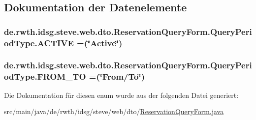 \subsection{Dokumentation der Datenelemente}
\hypertarget{enumde_1_1rwth_1_1idsg_1_1steve_1_1web_1_1dto_1_1_reservation_query_form_1_1_query_period_type_a775d5731727cbdda2f9cba8b51a4ca5a}{
\subsubsection[{A\-C\-T\-I\-V\-E}]{\setlength{\rightskip}{0pt plus 5cm}de.\-rwth.\-idsg.\-steve.\-web.\-dto.\-Reservation\-Query\-Form.\-Query\-Period\-Type.\-A\-C\-T\-I\-V\-E =(\char`\"{}Active\char`\"{})}}\label{enumde_1_1rwth_1_1idsg_1_1steve_1_1web_1_1dto_1_1_reservation_query_form_1_1_query_period_type_a775d5731727cbdda2f9cba8b51a4ca5a}
\hypertarget{enumde_1_1rwth_1_1idsg_1_1steve_1_1web_1_1dto_1_1_reservation_query_form_1_1_query_period_type_a44ca90614a7a7c041d770c226171a9e7}{
\subsubsection[{F\-R\-O\-M\-\_\-\-T\-O}]{\setlength{\rightskip}{0pt plus 5cm}de.\-rwth.\-idsg.\-steve.\-web.\-dto.\-Reservation\-Query\-Form.\-Query\-Period\-Type.\-F\-R\-O\-M\-\_\-\-T\-O =(\char`\"{}From/To\char`\"{})}}\label{enumde_1_1rwth_1_1idsg_1_1steve_1_1web_1_1dto_1_1_reservation_query_form_1_1_query_period_type_a44ca90614a7a7c041d770c226171a9e7}


Die Dokumentation für diesen enum wurde aus der folgenden Datei generiert\-:\begin{DoxyCompactItemize}
\item 
src/main/java/de/rwth/idsg/steve/web/dto/\hyperlink{_reservation_query_form_8java}{Reservation\-Query\-Form.\-java}\end{DoxyCompactItemize}
